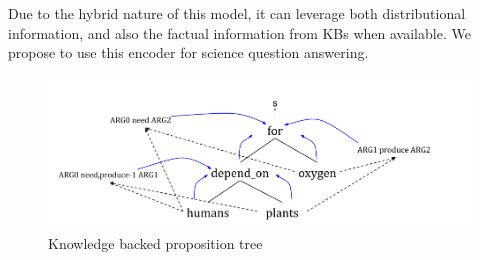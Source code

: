 Due to the hybrid nature of this model, it can leverage both distributional information, and also the factual information from KBs when available. We propose to use this encoder for science question answering.
\begin{figure}
\begin{center}
\includegraphics[width=5in]{figures/knowledge_backed_prop_tree.png}
\caption{Knowledge backed proposition tree}
\label{fig:kb_prop_tree}
\end{center}
\end{figure}